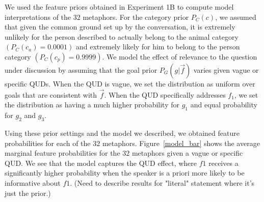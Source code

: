 \documentclass[10pt,letterpaper]{article}
\begin{document}

We used the feature priors obtained in Experiment 1B to compute model interpretations of the $32$ metaphors.
For the category prior $P_C(c)$, we assumed that given the common ground set up by the conversation, it is extremely unlikely for the person described to actually belong to the animal category $(P_C(c_a) = 0.0001)$ and extremely likely for him to belong to the person category $(P_C(c_p) = 0.9999)$. We model the effect of relevance to the question under discussion by assuming that the goal prior $P_G(g | \vec f)$ varies given vague or specific QUDs. When the QUD is vague, we set the distribution as uniform over goals that are consistent with $\vec f$. When the QUD specifically addresses $f_1$, we set the distribution as having a much higher probability for $g_1$ and equal probability for $g_2$ and $g_3$.

Using these prior settings and the model we described, we obtained feature probabilities for each of the $32$ metaphors. Figure~\ref{model_bar} shows the average marginal feature probabilities for the $32$ metaphors given a vague or specific QUD. We see that the model captures the QUD effect, where $f1$ receives a significantly higher probability when the speaker is a priori more likely to be informative about $f1$. (Need to describe results for "literal" statement where it's just the prior.)
\end{document}
